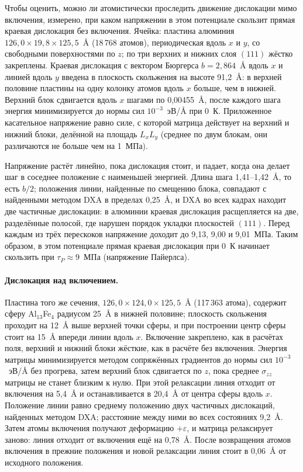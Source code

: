 \documentclass[11pt,a4paper]{article}
\begin{document}
Чтобы оценить, можно ли атомистически проследить движение дислокации мимо
включения, измерено, при каком напряжении в этом потенциале скользит
прямая краевая дислокация без включения. Ячейка: пластина алюминия
$126{,}0\times19{,}8\times125{,}5$~\AA{} (18\,768 атомов), периодическая
вдоль $x$ и $y$, со свободными поверхностями по $z$; по три верхних и нижних
слоя $(111)$ жёстко закреплены. Краевая дислокация с вектором Бюргерса
$b=2{,}864$~\AA{} вдоль $x$ и линией вдоль $y$ введена в плоскость
скольжения на высоте 91{,}2~\AA{}: в верхней половине пластины на одну
колонку атомов вдоль $x$ больше, чем в нижней. Верхний блок сдвигается
вдоль $x$ шагами по 0{,}00455~\AA, после каждого шага энергия минимизируется
до нормы сил $10^{-3}$~эВ/\AA{} при 0~К. Приложенное касательное напряжение
равно силе, с которой матрица действует на верхний и нижний блоки,
делённой на площадь $L_xL_y$ (среднее по двум блокам, они различаются не
больше чем на 1~МПа).

Напряжение растёт линейно, пока дислокация стоит, и падает, когда она
делает шаг в соседнее положение с наименьшей энергией. Длина шага
1{,}41--1{,}42~\AA, то есть $b/2$; положения линии, найденные
по смещению блока, совпадают с найденными методом DXA \cite{Stukowski2012DXA}
в пределах 0{,}25~\AA, и DXA во всех кадрах находит две частичные
дислокации: в алюминии краевая дислокация расщепляется на две, разделённые
полосой, где нарушен порядок укладки плоскостей $(111)$. Перед каждым из трёх перескоков напряжение доходит до 9{,}13,
9{,}00 и 9{,}01~МПа. Таким образом, в этом потенциале прямая краевая
дислокация при 0~К начинает скользить при $\tau_P\approx9$~МПа (напряжение
Пайерлса).

\paragraph{Дислокация над включением.} Пластина того же сечения,
$126{,}0\times124{,}0\times125{,}5$~\AA{} (117\,363 атома), содержит сферу
Al$_{13}$Fe$_4$ радиусом 25~\AA{} в нижней половине; плоскость скольжения
проходит на 12~\AA{} выше верхней точки сферы, и при построении центр сферы
стоит на 15~\AA{} впереди линии вдоль $x$. Включение закреплено, как в
расчётах поля, верхний и нижний блоки жёсткие, как в расчёте без включения.
Энергия матрицы минимизируется методом сопряжённых градиентов до нормы сил
$10^{-3}$~эВ/\AA{} без прогрева, затем верхний блок
сдвигается по $z$, пока среднее $\sigma_{zz}$ матрицы не станет близким
к нулю. При этой релаксации линия отходит от включения на 5{,}4~\AA{}
и останавливается в 20{,}4~\AA{} от центра сферы вдоль $x$. Положение линии
равно среднему положению двух частичных дислокаций, найденных методом DXA;
расстояние между ними во всех состояниях 9{,}2~\AA. Затем атомы включения
получают деформацию $+\varepsilon$, и матрица релаксирует заново: линия
отходит от включения ещё на 0{,}78~\AA. После возвращения атомов
включения в прежние положения и новой релаксации линия стоит в 0{,}06~\AA{}
от исходного положения.
\end{document}
